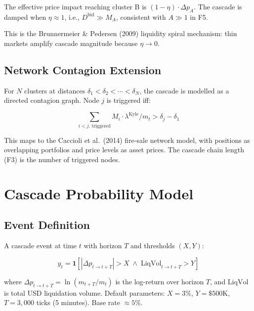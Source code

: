 \documentclass[11pt,a4paper]{article}
\begin{document}
The effective price impact reaching cluster B is $(1 - \eta) \cdot \Delta p_A$. The cascade is damped when $\eta \approx 1$, i.e., $D^{\text{bid}} \gg M_A$, consistent with $A \gg 1$ in F5.

This is the Brunnermeier \& Pedersen (2009) liquidity spiral mechanism: thin markets amplify cascade magnitude because $\eta \to 0$.

\subsection{Network Contagion Extension}

For $N$ clusters at distances $\delta_1 < \delta_2 < \cdots < \delta_N$, the cascade is modelled as a directed contagion graph. Node $j$ is triggered iff:

\begin{equation}
\sum_{i < j,\, \text{triggered}} M_i \cdot \lambda^{\text{Kyle}} / m_t > \delta_j - \delta_1
\end{equation}

This maps to the Caccioli et al.\ (2014) fire-sale network model, with positions as overlapping portfolios and price levels as asset prices. The cascade chain length (F3) is the number of triggered nodes.

\section{Cascade Probability Model}
\label{sec:model}

\subsection{Event Definition}

A cascade event at time $t$ with horizon $T$ and thresholds $(X, Y)$:

\begin{equation}
y_t = \mathbf{1}\!\left[|\Delta p_{t \to t+T}| > X \;\wedge\; \text{LiqVol}_{t \to t+T} > Y\right]
\end{equation}

where $\Delta p_{t \to t+T} = \ln(m_{t+T}/m_t)$ is the log-return over horizon $T$, and $\text{LiqVol}$ is total USD liquidation volume. Default parameters: $X = 3\%$, $Y = \$500\text{K}$, $T = 3{,}000$ ticks (5 minutes). Base rate $\approx 5\%$.
\end{document}
